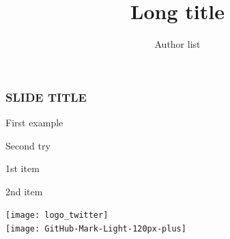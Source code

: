 \documentclass[final,table,svgnames]{beamer}
\author[Short author list]{Author list}
\institute[SOCIB]{Balearic Islands Coastal Observing and Forecasting System}
\title[Short title]{Long title}
\date[\today]{}
\begin{document}
{
\begin{frame}


\centering

\footnotesize
\maketitle

\end{frame}
}


\begin{frame}[c]
\frametitle{SLIDE TITLE}

\begin{enumline}
\item First example
\item Second try
\end{enumline}

\hfill 

\begin{itemline}
\item 1st item
\item 2nd item
\end{itemline}

\end{frame}

{
\begin{frame}[c]
\huge

\vspace{1cm}
\shadowoffset{1.5pt}

\begin{center}
\vspace{1cm}
\large
\texttt{[image: logo\_twitter]}\,\\
\texttt{[image: GitHub-Mark-Light-120px-plus]}\,
\end{center}

\end{frame}
}
\end{document}
